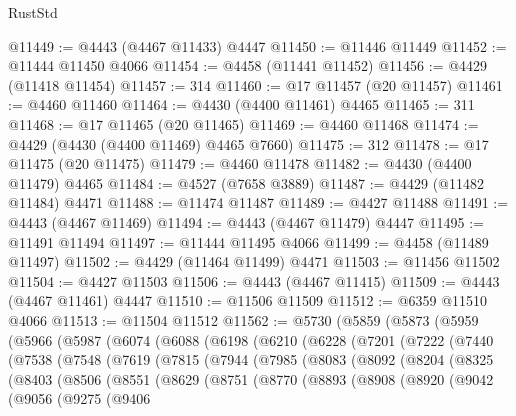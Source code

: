 \begin{lexlean}{RustStd}
\begin{coremodule}
@11449 := @4443 (@4467 @11433) @4447
@11450 := @11446 @11449
@11452 := @11444 @11450 @4066
@11454 := @4458 (@11441 @11452)
@11456 := @4429 (@11418 @11454)
@11457 := 314
@11460 := @17 @11457 (@20 @11457)
@11461 := @4460 @11460
@11464 := @4430 (@4400 @11461) @4465
@11465 := 311
@11468 := @17 @11465 (@20 @11465)
@11469 := @4460 @11468
@11474 := @4429 (@4430 (@4400 @11469) @4465 @7660)
@11475 := 312
@11478 := @17 @11475 (@20 @11475)
@11479 := @4460 @11478
@11482 := @4430 (@4400 @11479) @4465
@11484 := @4527 (@7658 @3889)
@11487 := @4429 (@11482 @11484) @4471
@11488 := @11474 @11487
@11489 := @4427 @11488
@11491 := @4443 (@4467 @11469)
@11494 := @4443 (@4467 @11479) @4447
@11495 := @11491 @11494
@11497 := @11444 @11495 @4066
@11499 := @4458 (@11489 @11497)
@11502 := @4429 (@11464 @11499) @4471
@11503 := @11456 @11502
@11504 := @4427 @11503
@11506 := @4443 (@4467 @11415)
@11509 := @4443 (@4467 @11461) @4447
@11510 := @11506 @11509
@11512 := @6359 @11510 @4066
@11513 := @11504 @11512
@11562 := @5730
    (@5859
      (@5873
        (@5959
          (@5966
            (@5987
              (@6074
                (@6088
                  (@6198
                    (@6210
                      (@6228
                        (@7201
                          (@7222
                            (@7440
                              (@7538
                                (@7548
                                  (@7619
                                    (@7815
                                      (@7944
                                        (@7985
                                          (@8083
                                            (@8092
                                              (@8204
                                                (@8325
                                                  (@8403
                                                    (@8506
                                                      (@8551
                                                        (@8629
                                                          (@8751
                                                            (@8770
                                                              (@8893
                                                                (@8908
                                                                  (@8920
                                                                    (@9042
                                                                      (@9056
                                                                        (@9275
                                                                          (@9406

\end{coremodule}
\end{lexlean}
